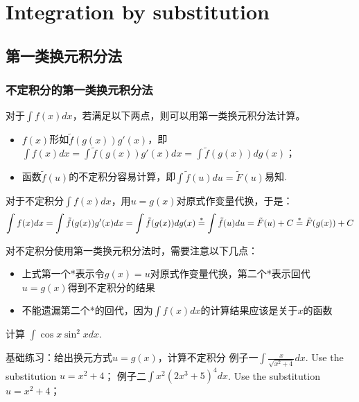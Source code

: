 \documentclass[lang=cn,newtx,10pt,scheme=chinese]{elegantbook}
\begin{document}
\chapter{Integration by substitution}
\section{第一类换元积分法}

\subsection{不定积分的第一类换元积分法}
对于$\int f(x) dx$，若满足以下两点，则可以用第一类换元积分法计算。
\begin{itemize}
\item $f(x)$形如$\tilde{f}(g(x))g'(x)$，即$\int f(x)dx = \int \tilde{f}(g(x))g'(x)dx = \int \tilde{f}(g(x))dg(x)$；
\item 函数$\tilde{f}(u)$的不定积分容易计算，即$\int \tilde{f}(u)du = \tilde{F}(u)$易知.
\end{itemize}
\begin{theorem}[第一类换元积分法]
对于不定积分$\int f(x)dx$，用$u=g(x)$对原式作变量代换，于是：
  \begin{equation*}
    \int f(x)dx = \int \tilde{f}(g(x))g'(x)dx = \int \tilde{f}(g(x))dg(x)
    \overset{\rm{*}}= \int \tilde{f}(u)du = \tilde{F}(u) + C \overset{\rm{*}}= \tilde{F}(g(x))+C
  \end{equation*}
\end{theorem}

对不定积分使用第一类换元积分法时，需要注意以下几点：
\begin{itemize}
\item 上式第一个*表示令$g(x)=u$对原式作变量代换，第二个*表示回代$u=g(x)$得到不定积分的结果
  \item 不能遗漏第二个*的回代，因为$\int f(x)dx$的计算结果应该是关于$x$的函数
\end{itemize}
\begin{example}
  计算 $\int \cos x \sin^2 x dx$.
\end{example}
\begin{solution}

\end{solution}

基础练习：给出换元方式$u=g(x)$，计算不定积分 
例子一$\int \frac{x}{\sqrt{x^2+4}}dx$. Use the substitution $u=x^2+4$；
例子二$\int x^2(2x^3+5)^4dx$. Use the substitution $u=x^2+4$；
\end{document}
